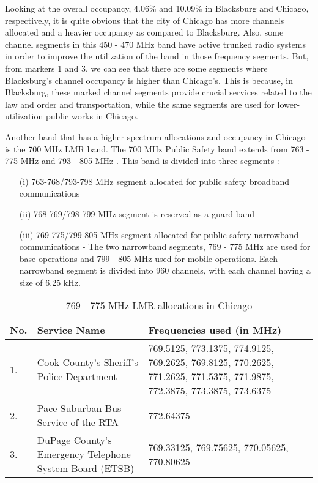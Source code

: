 \documentclass[12pt,sts]{report}
\begin{document}
	Looking at the overall occupancy, 4.06\% and 10.09\% in Blacksburg and Chicago, respectively, it is quite obvious that the city of Chicago has more channels allocated \cite{chicago_spec_occ} and a heavier occupancy as compared to Blacksburg. Also, some channel segments in this 450 - 470 MHz band have active trunked radio systems in order to improve the utilization of the band in those frequency segments. But, from markers 1 and 3, we can see that there are some segments where Blacksburg's channel occupancy is higher than Chicago's. This is because, in Blacksburg, these marked channel segments provide crucial services related to the law and order and transportation, while the same segments are used for lower-utilization public works in Chicago.
	
	Another band that has a higher spectrum allocations and occupancy in Chicago is the 700 MHz LMR band. The 700 MHz Public Safety band extends from 763 - 775 MHz and 793 - 805 MHz \cite{fcc_700_MHz_lmr}. This band is divided into three segments \cite{fcc_700_MHz_lmr}:
	
	\begin{enumerate}
		\item[(i)] 763-768/793-798 MHz segment allocated for public safety broadband communications
		\item[(ii)] 768-769/798-799 MHz segment is reserved as a guard band
		\item[(iii)] 769-775/799-805 MHz segment allocated for public safety narrowband communications - The two narrowband segments, 769 - 775 MHz are used for base operations and 799 - 805 MHz used for mobile operations. Each narrowband segment is divided into 960 channels, with each channel having a size of 6.25 kHz.
	\end{enumerate}
	
	\begin{table}[ht!]
	\centering
		\begin{tabular}{| p{1cm} | p{6cm} | p{4cm} |}
		\hline
		No. & Service Name & Frequencies used (in MHz)	\\	\hline
		1. & Cook County's Sheriff's Police Department & 769.5125, 773.1375, 774.9125, 769.2625, 769.8125, 770.2625, 771.2625, 771.5375, 771.9875, 772.3875, 773.3875, 773.6375 \\ \hline
		2. & Pace Suburban Bus Service of the RTA & 772.64375	\\	\hline
		3. & DuPage County's Emergency Telephone System Board (ETSB) & 769.33125, 769.75625, 770.05625, 770.80625	\\
		\hline
		\end{tabular}
		\caption{769 - 775 MHz LMR allocations in Chicago}
	\end{table}
	
\end{document}
